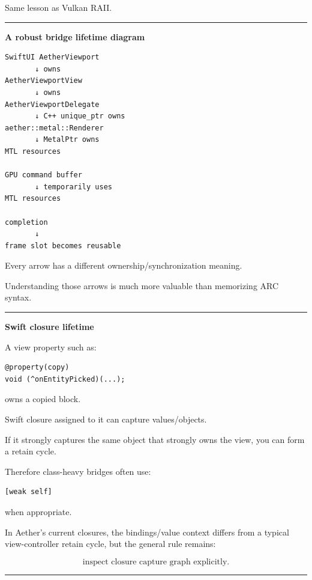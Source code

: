 Same lesson as Vulkan RAII.

\begin{center}\rule{0.5\linewidth}{0.5pt}\end{center}

\textbf{A robust bridge lifetime diagram}

\begin{verbatim}
SwiftUI AetherViewport
       ↓ owns
AetherViewportView
       ↓ owns
AetherViewportDelegate
       ↓ C++ unique_ptr owns
aether::metal::Renderer
       ↓ MetalPtr owns
MTL resources

GPU command buffer
       ↓ temporarily uses
MTL resources

completion
       ↓
frame slot becomes reusable
\end{verbatim}

Every arrow has a different ownership/synchronization meaning.

Understanding those arrows is much more valuable than memorizing ARC syntax.

\begin{center}\rule{0.5\linewidth}{0.5pt}\end{center}

\textbf{Swift closure lifetime}

A view property such as:

\begin{verbatim}
@property(copy)
void (^onEntityPicked)(...);
\end{verbatim}

owns a copied block.

Swift closure assigned to it can capture values/objects.

If it strongly captures the same object that strongly owns the view, you can form a retain cycle.

Therefore class-heavy bridges often use:

\begin{verbatim}
[weak self]
\end{verbatim}

when appropriate.

In Aether's current  closures, the bindings/value context differs from a typical view-controller retain cycle, but the general rule remains:

\[
\boxed{
\text{inspect closure capture graph explicitly}.
}
\]

\begin{center}\rule{0.5\linewidth}{0.5pt}\end{center}

